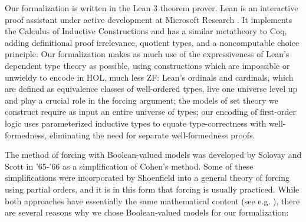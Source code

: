 \documentclass[a4paper,USenglish,cleveref, autoref]{lipics-v2019}
\newcommand{\lil}{\lstinline}
\theoremstyle{theorem}
\theoremstyle{definition}
\begin{document}
Our formalization is written in the Lean 3 theorem prover. Lean is an interactive proof assistant under active development at Microsoft Research \cite{de2015lean, sebastian1}. It implements the Calculus of Inductive Constructions and has a similar metatheory to Coq, adding definitional proof irrelevance, quotient types, and a noncomputable choice principle. %
Our formalization makes as much use of the expressiveness of Lean's dependent type theory as possible, using constructions which are impossible or unwieldy to encode in HOL, much less ZF: Lean's ordinals and cardinals, which are defined as equivalence classes of well-ordered types, live one universe level up and play a crucial role in the forcing argument; the models of set theory we construct require as input an entire universe of types; our encoding of first-order logic uses parameterized inductive types to equate type-correctness with well-formedness, eliminating the need for separate well-formedness proofs.

The method of forcing with Boolean-valued models was developed by Solovay and Scott in '65-'66 \cite{scott1967proof,scott-solovay} as a simplification of Cohen's method. Some of these simplifications were incorporated by Shoenfield \cite{shoenfield1971unramified} into a general theory of forcing using partial orders, and it is in this form that forcing is usually practiced. While both approaches have essentially the same mathematical content (see e.g. \cite{kunen2014set, jech2013set, moore2019method}), there are several reasons why we chose Boolean-valued models for our formalization:
\end{document}
